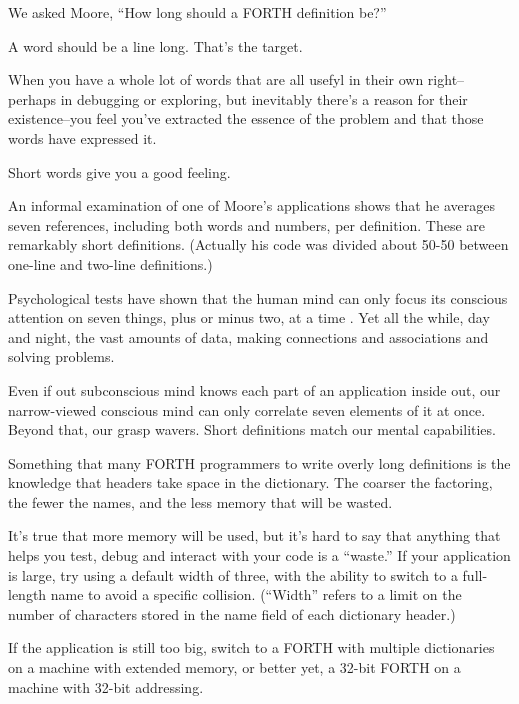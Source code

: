 \begin{interview}
We asked Moore,
``How long should a FORTH definition be?''

\begin{tfquot}
A word should be a line long. That's the target.

When you have a whole lot of words that are all usefyl in their own right--perhaps in debugging or exploring, but inevitably there's a reason for their existence--you feel you've extracted the essence of the problem and that those words have expressed it.

Short words give you a good feeling.
\end{tfquot}
\end{interview}

An informal examination of one of Moore's applications shows that he averages seven references, including both words and numbers, per definition. These are remarkably short definitions. (Actually his code was divided about 50-50 between one-line and two-line definitions.)

Psychological tests have shown that the human mind can only focus its conscious attention on seven things, plus or minus two, at a time \cite{miller56}. Yet all the while, day and night, the vast amounts of data, making connections and associations and solving problems.

Even if out subconscious mind knows each part of an application inside out, our narrow-viewed conscious mind can only correlate seven elements of it at once. Beyond that, our grasp wavers. Short definitions match our mental capabilities.

Something that many FORTH programmers to write overly long definitions is the knowledge that headers take space in the dictionary. The coarser the factoring, the fewer the names, and the less memory that will be wasted.

It's true that more memory will be used, but it's hard to say that anything that helps you test, debug and interact with your code is a ``waste.'' If your application is large, try using a default width of three, with the ability to switch to a full-length name to avoid a specific collision. (``Width'' refers to a limit on the number of characters stored in the name field of each dictionary header.)

If the application is still too big, switch to a FORTH with multiple dictionaries on a machine with extended memory, or better yet, a 32-bit FORTH on a machine with 32-bit addressing.

